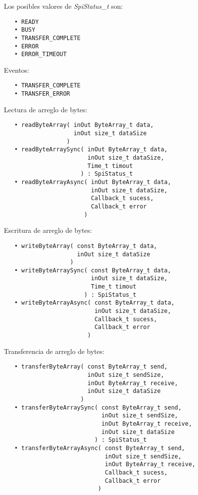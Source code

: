 Los posibles valores de \emph{SpiStatus\_t} son:

\begin{verbatim}
   • READY
   • BUSY
   • TRANSFER_COMPLETE
   • ERROR
   • ERROR_TIMEOUT
\end{verbatim}

Eventos:

\begin{verbatim}
   • TRANSFER_COMPLETE
   • TRANSFER_ERROR
\end{verbatim}



Lectura de arreglo de bytes:

\begin{verbatim}
   • readByteArray( inOut ByteArray_t data,
                    inOut size_t dataSize
                  )
   • readByteArraySync( inOut ByteArray_t data,
                        inOut size_t dataSize,
                        Time_t timout
                      ) : SpiStatus_t
   • readByteArrayAsync( inOut ByteArray_t data, 
                         inOut size_t dataSize,
                         Callback_t sucess,
                         Callback_t error 
                       )
\end{verbatim}

Escritura de arreglo de bytes:

\begin{verbatim}
   • writeByteArray( const ByteArray_t data,
                     inOut size_t dataSize
                   )
   • writeByteArraySync( const ByteArray_t data,
                         inOut size_t dataSize,
                         Time_t timout
                       ) : SpiStatus_t
   • writeByteArrayAsync( const ByteArray_t data, 
                          inOut size_t dataSize,
                          Callback_t sucess,
                          Callback_t error 
                        )
\end{verbatim}

Transferencia de arreglo de bytes:

\begin{verbatim}
   • transferByteArray( const ByteArray_t send,
                        inOut size_t sendSize,
                        inOut ByteArray_t receive,
                        inOut size_t dataSize
                      )
   • transferByteArraySync( const ByteArray_t send,
                            inOut size_t sendSize,
                            inOut ByteArray_t receive,
                            inOut size_t dataSize
                          ) : SpiStatus_t
   • transferByteArrayAsync( const ByteArray_t send,
                             inOut size_t sendSize,
                             inOut ByteArray_t receive,
                             Callback_t sucess,
                             Callback_t error 
                           )
\end{verbatim}

